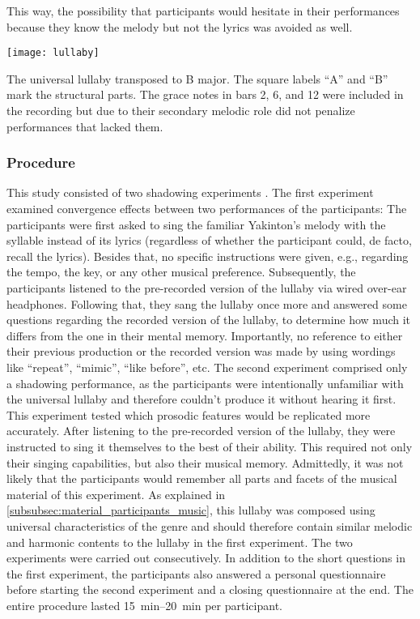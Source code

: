 This way, the possibility that participants would hesitate in their performances because they know the melody but not the lyrics was avoided as well.
%
\begin{snippet}[t]
	\centering
	\texttt{[image: lullaby]}
	\caption[Universal lullaby]
		{The universal lullaby transposed to B major.
		The square labels \enquote{A} and \enquote{B} mark the structural parts.
		The grace notes in bars 2, 6, and 12 were included in the recording but due to their secondary melodic role did not penalize performances that lacked them.}
	\label{snippet:uni-lullaby}
\end{snippet}

\subsubsection{Procedure}
\label{subsubsec:procedure_music}

This study consisted of two shadowing experiments \citep[see \cref{sec:shadowing_paradigm} and][]{Raveh2020SpeechProsody}.
The first experiment examined convergence effects between two performances of the participants:
The participants were first asked to sing the familiar Yakinton's melody with the syllable \textipa{[na]} instead of its lyrics (regardless of whether the participant could, de facto, recall the lyrics).
Besides that, no specific instructions were given, e.g., regarding the tempo, the key, or any other musical preference.
Subsequently, the participants listened to the pre-recorded version of the lullaby via wired over-ear headphones. %
Following that, they sang the lullaby once more and answered some questions regarding the recorded version of the lullaby, to determine how much it differs from the one in their mental memory.
Importantly, no reference to either their previous production or the recorded version was made by using wordings like \enquote{repeat}, \enquote{mimic}, \enquote{like before}, etc.
The second experiment comprised only a shadowing performance, as the participants were intentionally unfamiliar with the universal lullaby and therefore couldn't produce it without hearing it first.
This experiment tested which prosodic features would be replicated more accurately.
After listening to the pre-recorded version of the lullaby, they were instructed to sing it themselves to the best of their ability.
This required not only their singing capabilities, but also their musical memory.
Admittedly, it was not likely that the participants would remember all parts and facets of the musical material of this experiment.
As explained in \cref{subsubsec:material_participants_music}, this lullaby was composed using universal characteristics of the genre and should therefore contain similar melodic and harmonic contents to the lullaby in the first experiment.
The two experiments were carried out consecutively.
In addition to the short questions in the first experiment, the participants also answered a personal questionnaire before starting the second experiment and a closing questionnaire at the end.
The entire procedure lasted \SIrange{15}{20}{\minute} per participant.

